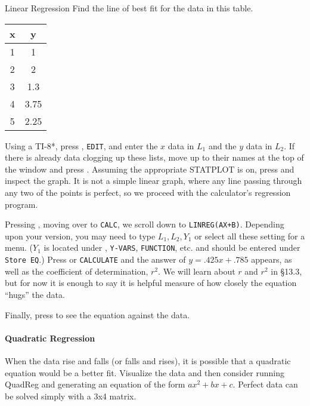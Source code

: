 \begin{example}{Linear Regression}
\exProblem
Find the line of best fit for the data in this table.

\begin{tabular}{c|c}
   \textbf{x} & \textbf{y} \\ \hline 
   1 & 1 \\
   2 & 2 \\
   3 & 1.3 \\
   4 & 3.75 \\
   5 & 2.25 \\
\end{tabular}

\exSolution
Using a TI-8*, press \Touche[style=function,principal=stat], \texttt{EDIT}, and enter the $x$ data in 
$L_1$ and the $y$ data in $L_2$.  If
there is already data clogging up these lists, move up to their names at the top of the window
and press \Touche[style=function,principal=clear]  \Touche[style=enter,principal=enter,raise=-5pt].  Assuming
the appropriate STATPLOT is on, press \Touche[style=graph,principal={zoom},position=0.9,fontsize=7pt]
\Touche[style=number,principal=9] and inspect the graph.  It is not a simple linear graph, where
any line passing through any two of the points is perfect, so we proceed with the calculator's regression
program.

Pressing \Touche[style=function,principal=stat], moving over to \texttt{CALC}, we scroll down to 
\texttt{LINREG(AX+B)}.  Depending upon your version,
you may need to type $L_1, L_2, Y_1$ or select all these setting for a menu.  ($Y_1$ is located under
\Touche[style=function,principal={vars},raise=-5pt], \texttt{Y-VARS}, \texttt{FUNCTION}, etc. and should be 
entered under \texttt{Store EQ}.) Press \Touche[style=enter,principal=enter] or \texttt{CALCULATE}
and the answer of $y=.425x+.785$ appears, as well as the coefficient of determination, $r^2$.  
 We will learn about $r$ and $r^2$ in §13.3, but for now it is enough to say it is helpful
measure of how closely the equation ``hugs'' the data.

Finally, press \Touche[style=graph,principal=graph,position=0.9,fontsize=7pt,raise=-5pt] to see the equation 
against the data.
\end{example}

\paragraph{Quadratic Regression}
When the data rise and falls (or falls and rises), it is possible that a quadratic equation would be a better fit.
Visualize the data and then consider running QuadReg and generating an equation of the form $ax^2+bx+c$.
Perfect data can be solved simply with a 3x4 matrix.

